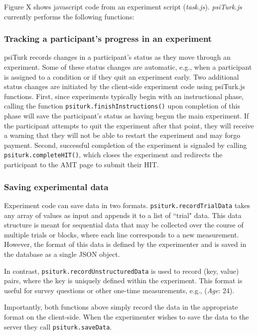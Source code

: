 \documentclass[twocolumn]{svjour3}          %
\begin{document}
Figure X shows javascript code from an experiment script (\emph{task.js}). 
\emph{psiTurk.js} currently performs the following functions:


\subsubsection{Tracking a participant's progress in an experiment} 

psiTurk records changes in a participant's status as they move through an experiment. 
Some of these status changes are automatic, e.g., when a participant is assigned to a condition or if they quit an experiment early. 
Two additional status changes are initiated by the client-side experiment code using psiTurk.js functions.
First, since experiments typically begin with an instructional phase, calling the function \texttt{psiturk.finishInstructions()} upon completion of this phase will save the participant's status as having begun the main experiment.
If the participant attempts to quit the experiment after that point, they will receive a warning that they will not be able to restart the experiment and may forgo payment.
Second, successful completion of the experiment is signaled by calling \texttt{psiturk.completeHIT()}, which closes the experiment and redirects the participant to the AMT page to submit their HIT.

\subsubsection{Saving experimental data} 

Experiment code can save data in two formats.
\texttt{psiturk.recordTrialData} takes any array of values as input and appends it to a list of ``trial" data.
This data structure is meant for sequential data that may be collected over the course of multiple trials or blocks, where each line corresponds to a new measurement.
However, the format of this data is defined by the experimenter and is saved in the database as a single JSON object.

In contrast, \texttt{psiturk.recordUnstructuredData} is used to record (key, value) pairs, where the key is uniquely defined within the experiment.
This format is useful for survey questions or other one-time measurements, e.g., (\emph{Age}: 24).

Importantly, both functions above simply record the data in the appropriate format on the client-side.
When the experimenter wishes to save the data to the server they call \texttt{psiturk.saveData}.
\end{document}

